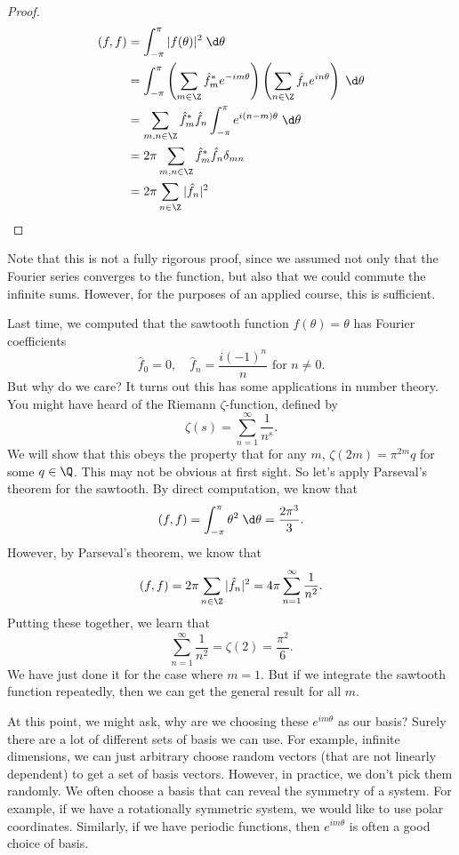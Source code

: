 \documentclass[a4paper]{article}
\begin{document}
\begin{proof}
  \begin{align*}
    (f, f) &= \int_{-\pi}^\pi |f(\theta)|^2 \;\d \theta\\
    &= \int_{-\pi}^{\pi} \left(\sum_{m \in \Z} \hat{f}_m^* e^{-im\theta}\right)\left(\sum_{n \in \Z} \hat{f}_n e^{in\theta}\right)\;\d \theta\\
    &= \sum_{m, n\in \Z}\hat{f}_m^* \hat{f}_n \int_{-\pi}^\pi e^{i(n - m)\theta}\;\d \theta\\
    &= 2\pi \sum_{m, n\in \Z}\hat{f}_m^* \hat{f}_n \delta_{mn}\\
    &= 2\pi \sum_{n\in \Z}|\hat{f}_n|^2
  \end{align*}
\end{proof}
Note that this is not a fully rigorous proof, since we assumed not only that the Fourier series converges to the function, but also that we could commute the infinite sums. However, for the purposes of an applied course, this is sufficient.

Last time, we computed that the sawtooth function $f(\theta) = \theta$ has Fourier coefficients
\[
  \hat{f}_0 = 0,\quad \hat{f}_n = \frac{i(-1)^{n}}{n}\text{ for }n\not= 0.
\]
But why do we care? It turns out this has some applications in number theory. You might have heard of the Riemann $\zeta$-function, defined by
\[
  \zeta(s) = \sum_{n = 1}^\infty \frac{1}{n^s}.
\]
We will show that this obeys the property that for any $m$, $\zeta(2m) = \pi^{2m}q$ for some $q\in \Q$. This may not be obvious at first sight. So let's apply Parseval's theorem for the sawtooth. By direct computation, we know that
\[
  (f, f) = \int_{-\pi}^\pi \theta^2 \;\d \theta = \frac{2\pi^3}{3}.
\]
However, by Parseval's theorem, we know that
\[
  (f, f) = 2\pi \sum_{n \in \Z}|\hat{f}_n|^2 = 4\pi \sum_{n = 1}^\infty \frac{1}{n^2}.
\]
Putting these together, we learn that
\[
  \sum_{n = 1}^\infty \frac{1}{n^2} = \zeta(2) = \frac{\pi^2}{6}.
\]
We have just done it for the case where $m = 1$. But if we integrate the sawtooth function repeatedly, then we can get the general result for all $m$.

At this point, we might ask, why are we choosing these $e^{im\theta}$ as our basis? Surely there are a lot of different sets of basis we can use. For example, infinite dimensions, we can just arbitrary choose random vectors (that are not linearly dependent) to get a set of basis vectors. However, in practice, we don't pick them randomly. We often choose a basis that can reveal the symmetry of a system. For example, if we have a rotationally symmetric system, we would like to use polar coordinates. Similarly, if we have periodic functions, then $e^{im\theta}$ is often a good choice of basis.
\end{document}
